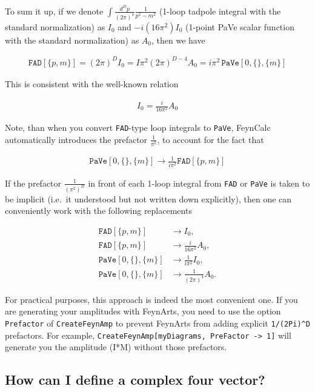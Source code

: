 \documentclass[../FeynCalcManual.tex]{subfiles}
\begin{document}
To sum it up, if we denote
\(\int \frac{d^D p}{(2 \pi)^4} \frac{1}{p^2-m^2}\) (1-loop tadpole
integral with the standard normalization) as \(I_0\) and
\(-i (16 \pi^2) I_0\) (1-point PaVe scalar function with the standard
normalization) as \(A_0\), then we have

\begin{align*}
\mathtt{FAD}[\{p,m\}] = (2\pi)^D I_0 = I \pi^2 (2 \pi)^{D-4} A_0 = i \pi^2 \, \mathtt{PaVe}[0, \{\}, \{m\}]
\end{align*}

This is consistent with the well-known relation

\begin{align*}
I_0 = \frac{i}{16 \pi^2} A_0
\end{align*}

Note, than when you convert \texttt{FAD}-type loop integrals to
\texttt{PaVe}, FeynCalc automatically introduces the prefactor
\(\frac{1}{\pi^2}\), to account for the fact that

\begin{align*}
\mathtt{PaVe}[0, \{\}, \{m\}] \to \frac{1}{i \pi^2} \mathtt{FAD}[\{p,m\}]
\end{align*}

If the prefactor \(\frac{1}{(\pi^2)^D}\) in front of each 1-loop
integral from \texttt{FAD} or \texttt{PaVe} is taken to be implicit
(i.e.~it understood but not written down explicitly), then one can
conveniently work with the following replacements

\begin{align*}
\mathtt{FAD}[\{p,m\}] &\to I_0, \\
\mathtt{FAD}[\{p,m\}] &\to \frac{i}{16 \pi^2} A_0, \\
\mathtt{PaVe}[0, \{\}, \{m\}] &\to \frac{1}{i \pi^2} I_0, \\
\mathtt{PaVe}[0, \{\}, \{m\}] &\to \frac{1}{(2 \pi)^4} A_0.
\end{align*}

For practical purposes, this approach is indeed the most convenient one.
If you are generating your amplitudes with FeynArts, you need to use the
option \texttt{Prefactor} of \texttt{CreateFeynAmp} to prevent FeynArts
from adding explicit \texttt{1/(2Pi)^D} prefactors. For example,
\texttt{CreateFeynAmp[\allowbreak{}myDiagrams,\ \allowbreak{}PreFactor -> 1]}
will generate you the amplitude (I*M) without those prefactors.

\subsection{How can I define a complex four
vector?}\label{how-can-i-define-a-complex-four-vector}
\end{document}
